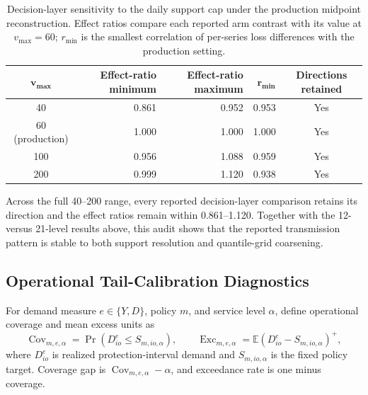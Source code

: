 \documentclass[msom,dblanonrev]{informs4}
\begin{document}
\begin{table}[htbp]
\caption{Decision-layer sensitivity to the daily support cap under the production midpoint reconstruction. Effect ratios compare each reported arm contrast with its value at $v_{\max}=60$; $r_{\min}$ is the smallest correlation of per-series loss differences with the production setting.}
\label{tab:oa_vmax}
\centering\small
\begin{tabular}{crrrc}
\toprule
$\boldsymbol{v_{\max}}$ & \textbf{Effect-ratio minimum} & \textbf{Effect-ratio maximum} & $\boldsymbol{r_{\min}}$ & \textbf{Directions retained} \\
\midrule
40  & 0.861 & 0.952 & 0.953 & Yes \\
60 (production) & 1.000 & 1.000 & 1.000 & Yes \\
100 & 0.956 & 1.088 & 0.959 & Yes \\
200 & 0.999 & 1.120 & 0.938 & Yes \\
\bottomrule
\end{tabular}
\end{table}

Across the full 40--200 range, every reported decision-layer comparison retains its direction and the effect ratios remain within 0.861--1.120.
Together with the 12- versus 21-level results above, this audit shows that the reported transmission pattern is stable to both support resolution and quantile-grid coarsening.

\subsection{Operational Tail-Calibration Diagnostics}\label{oa:tailcal}

For demand measure $e\in\{Y,D\}$, policy $m$, and service level $\alpha$, define operational coverage and mean excess units as
\[
\operatorname{Cov}_{m,e,\alpha}
=\Pr\!\left(D^{e}_{io}\leq S_{m,io,\alpha}\right),
\qquad
\operatorname{Exc}_{m,e,\alpha}
=\mathbb E\!\left(D^{e}_{io}-S_{m,io,\alpha}\right)^+,
\]
where $D^{e}_{io}$ is realized protection-interval demand and $S_{m,io,\alpha}$ is the fixed policy target.
Coverage gap is $\operatorname{Cov}_{m,e,\alpha}-\alpha$, and exceedance rate is one minus coverage.
\end{document}
